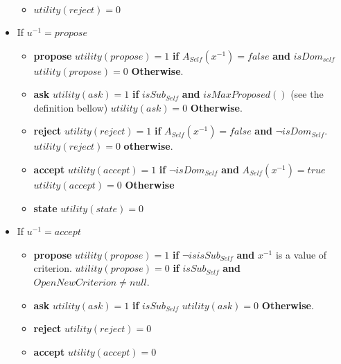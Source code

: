 \documentclass{llncs}
\begin{document}
\begin{itemize}
\begin{itemize}
		\item $utility(reject) = 0$
		\\
	\end{itemize}
	\item If $u ^{-1} =propose$ 
	\begin{itemize}
		\item \textbf{propose}
			\subitem $utility(propose) = 1$ \textbf{ if } $A_{Self} (x^{-1})= false$ \textbf{ and } $isDom_{self}$
			\subitem $utility(propose) = 0$  \textbf{Otherwise}.
		\item \textbf{ask}	
			\subitem $utility(ask) = 1$ \textbf{ if } $isSub_{Self}$ \textbf{ and } $isMaxProposed()$ (see the definition bellow)
			\subitem $utility(ask) = 0$ \textbf{Otherwise}.
		\item \textbf{reject}	
			\subitem $utility(reject) = 1$  \textbf{ if } $A_{Self} (x^{-1}) = false$ \textbf{ and } $\neg isDom_{Self}$.
			\subitem $utility(reject) = 0 $ \textbf{otherwise}.
		\item \textbf{accept}	
			\subitem $utility(accept) = 1$ \textbf{ if } $ \neg isDom_{Self}$ \textbf{ and }  $A_{Self} (x^{-1}) = true$ 
			\subitem $utility(accept) = 0 $ \textbf{Otherwise}
			
		\item \textbf{ state}
			\subitem $utility(state) = 0$
			\\
	\end{itemize}
	\item If $u^{-1}=accept$
	\begin{itemize}
	\item \textbf{propose}
		\subitem $utility(propose) = 1$ \textbf{ if } $ \neg isisSub_{Self}$ \textbf{ and } $x^{-1}$ is a value of criterion. 
		\subitem $utility(propose) = 0$  \textbf{ if } $isSub_{Self}$ \textbf{ and } $OpenNewCriterion \not= null$.
	\item \textbf{ask}	
		\subitem $utility(ask) = 1$ \textbf{ if } $isSub_{Self}$
		\subitem $utility(ask) = 0$ \textbf{Otherwise}.
	\item \textbf{reject}	
		\subitem $utility(reject) = 0 $ 
	\item \textbf{accept}	
		\subitem $utility(accept) = 0 $
	

\end{itemize}
\end{itemize}
\end{document}
